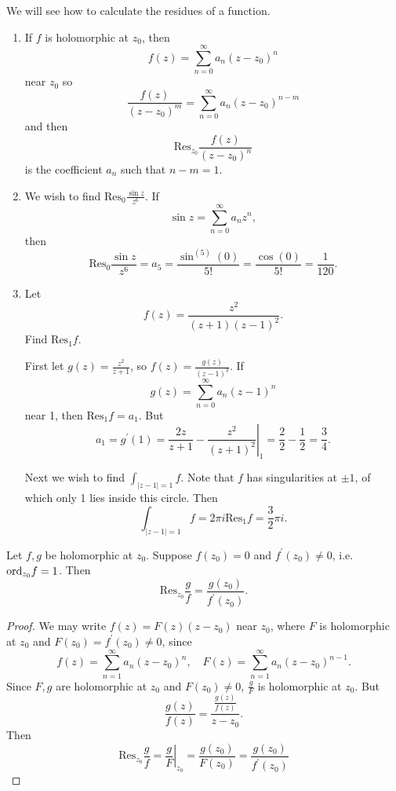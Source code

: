 \begin{xmpl}
We will see how to calculate the residues of a function.
\begin{enumerate}
  \item{
    If $f$ is holomorphic at $z_0$, then
    $$
    f(z) = \sum_{n=0}^\infty a_n (z - z_0)^n
    $$
    near $z_0$ so
    $$
    \frac{f(z)}{(z - z_0)^m} = \sum_{n=0}^\infty a_n (z - z_0)^{n-m}
    $$
    and then
    $$
    \mathrm{Res}_{z_0} \frac{f(z)}{(z - z_0)^n}
    $$
    is the coefficient $a_n$ such that $n - m = 1$.
  }
  \item{
    We wish to find $\mathrm{Res}_{0} \frac{\sin z}{z^6}$.
    If
    $$
    \sin z = \sum_{n=0}^\infty a_n z^n,
    $$
    then
    $$
      \mathrm{Res}_0 \frac{\sin z}{z^6}
    = a_5
    = \frac{\sin^{(5)}(0)}{5!}
    = \frac{\cos(0)}{5!}
    = \frac{1}{120}.
    $$
  }
  \item{
    Let
    $$
      f(z)
    = \frac{z^2}{(z+1)(z-1)^2}.
    $$
    Find $\mathrm{Res}_1 f$.

    First let $g(z) = \frac{z^2}{z+1}$, so $f(z) =
    \frac{g(z)}{(z-1)^2}$. If
    $$
    g(z) = \sum_{n=0}^\infty a_n (z - 1)^n
    $$
    near 1, then $\mathrm{Res}_1 f = a_1$. But
    $$
      a_1
    = g^\prime(1)
    = \left.
        \frac{2z}{z + 1} - \frac{z^2}{(z + 1)^2}
      \right|_1
    = \frac{2}{2} - \frac{1}{2} = \frac{3}{4}.
    $$

    Next we wish to find $\int_{|z - 1| = 1} f$. Note that
    $f$ has singularities at $\pm 1$, of which only 1 lies
    inside this circle. Then
    $$
    \int_{|z - 1| = 1} f = 2 \pi i \mathrm{Res}_1 f = \frac{3}{2} \pi i.
    $$
  }
\end{enumerate}
\end{xmpl}

\begin{lemma}
  Let $f, g$ be holomorphic at $z_0$. Suppose $f(z_0) = 0$ and
  $f^\prime(z_0) \neq 0$, i.e. $\mathrm{ord}_{z_0} f = 1$. Then
  $$
    \mathrm{Res}_{z_0} \frac{g}{f}
  = \frac{g(z_0)}{f^\prime(z_0)}.
  $$
\end{lemma}
\begin{proof}
  We may write $f(z) = F(z) (z - z_0)$ near $z_0$, where $F$ is
  holomorphic at $z_0$ and $F(z_0) = f^\prime(z_0) \neq 0$, since
  $$
  f(z) = \sum_{n=1}^\infty a_n (z - z_0)^n, \quad
  F(z) = \sum_{n=1}^\infty a_n (z - z_0)^{n-1}.
  $$
  Since $F, g$ are holomorphic at $z_0$ and $F(z_0) \neq 0$,
  $\frac{g}{F}$ is holomorphic at $z_0$. But
  $$
  \frac{g(z)}{f(z)} = \frac{\frac{g(z)}{f(z)}}{z - z_0}.
  $$
  Then
  $$
    \mathrm{Res}_{z_0} \frac{g}{f}
  = \left.\frac{g}{F}\right|_{z_0}
  = \frac{g(z_0)}{F(z_0)}
  = \frac{g(z_0)}{f^\prime(z_0)}
  $$
\end{proof}

